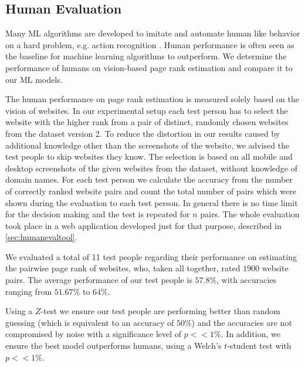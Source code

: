 \subsection{Human Evaluation}

Many ML algorithms are developed to imitate and automate human like behavior on a hard problem, e.g. action recognition \cite{gu2018ava}. Human performance is often seen as the baseline for machine learning algorithms to outperform. We determine the performance of humans on vision-based page rank estimation and compare it to our ML models. 

The human performance on page rank estimation is measured solely based on the vision of websites. In our experimental setup each test person has to select the website with the higher rank from a pair of distinct, randomly chosen websites from the dataset version 2. To reduce the distortion in our results caused by additional knowledge other than the screenshots of the website, we advised the test people to skip websites they know. The selection is based on all mobile and desktop screenshots of the given websites from the dataset, without knowledge of domain names.
For each test person we calculate the accuracy from the number of correctly ranked website pairs and count the total number of pairs which were shown during the evaluation to each test person. In general there is no time limit for the decision making and the test is repeated for $n$ pairs.
The whole evaluation took place in a web application developed just for that purpose, described in \ref{sec:humanevaltool}.

We evaluated a total of 11 test people regarding their performance on estimating the pairwise page rank of websites, who, taken all together, rated $1900$ website pairs. The average performance of our test people is $57.8\%$, with accuracies ranging from $51.67\%$ to $64\%$.

Using a $Z$-test we ensure our test people are performing better than random guessing (which is equivalent to an accuracy of $50\%$) and the accuracies are not compromised by noise with a significance level of $p << 1\%$. In addition, we ensure the best model outperforms humans, using a Welch's $t$-student test with $p << 1\%$.

